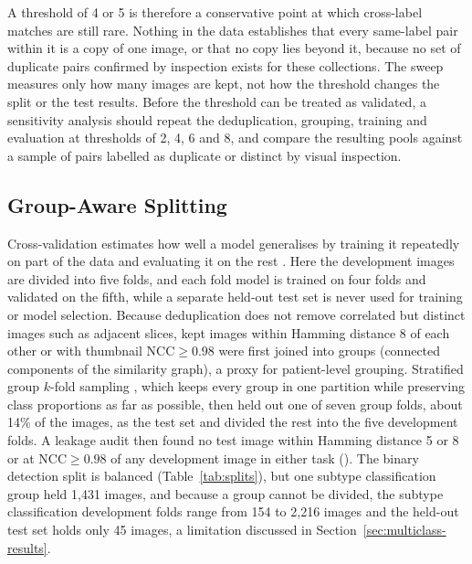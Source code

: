 \documentclass[a4paper,fleqn]{cas-sc}
\begin{document}
A threshold of 4 or 5 is therefore a conservative point at which cross-label matches are still rare. Nothing in the data establishes that every same-label pair within it is a copy of one image, or that no copy lies beyond it, because no set of duplicate pairs confirmed by inspection exists for these collections. The sweep measures only how many images are kept, not how the threshold changes the split or the test results. Before the threshold can be treated as validated, a sensitivity analysis should repeat the deduplication, grouping, training and evaluation at thresholds of 2, 4, 6 and 8, and compare the resulting pools against a sample of pairs labelled as duplicate or distinct by visual inspection.

\subsection{Group-Aware Splitting}
\label{sec:split}

Cross-validation estimates how well a model generalises by training it repeatedly on part of the data and evaluating it on the rest \citep{stone1974}. Here the development images are divided into five folds, and each fold model is trained on four folds and validated on the fifth, while a separate held-out test set is never used for training or model selection. Because deduplication does not remove correlated but distinct images such as adjacent slices, kept images within Hamming distance 8 of each other or with thumbnail $\mathrm{NCC}\geq 0.98$ were first joined into groups (connected components of the similarity graph), a proxy for patient-level grouping. Stratified group $k$-fold sampling \citep{pedregosa2011}, which keeps every group in one partition while preserving class proportions as far as possible, then held out one of seven group folds, about 14\% of the images, as the test set and divided the rest into the five development folds. A leakage audit then found no test image within Hamming distance 5 or 8 or at $\mathrm{NCC}\geq 0.98$ of any development image in either task (). The binary detection split is balanced (Table~\ref{tab:splits}), but one subtype classification group held 1,431 images, and because a group cannot be divided, the subtype classification development folds range from 154 to 2,216 images and the held-out test set holds only 45 images, a limitation discussed in Section~\ref{sec:multiclass-results}.
\end{document}
